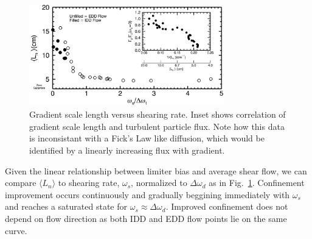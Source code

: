 \documentclass[%
 aps,
 prl,
 amsmath,amssymb,
 reprint,%
]{revtex4-1}
\begin{document}
\begin{figure}
\begin{center}
\includegraphics[width=8.5cm]{shearandgrad.pdf}%
\caption{\label{fig:shearandgrad} Gradient scale length versus shearing rate. Inset shows correlation of gradient scale length and turbulent particle flux. Note how this data is inconsistant with a Fick's Law like diffusion, which would be identified by a linearly increasing flux with gradient.}
\end{center}
\end{figure}

Given the linear relationship between limiter bias and average shear flow, we can compare $\langle L_{n} \rangle$ to shearing rate, $\omega_{s}$, normalized to $\Delta \omega_{d}$ as in Fig.~\ref{fig:shearandgrad}. Confinement improvement occurs continuously and gradually beggining immediately with $\omega_{s}$ and reaches a saturated state for $\omega_{s} \approx \Delta \omega_{d}$. Improved confinement does not depend on flow direction as both IDD and EDD flow points lie on the same curve.
\end{document}
